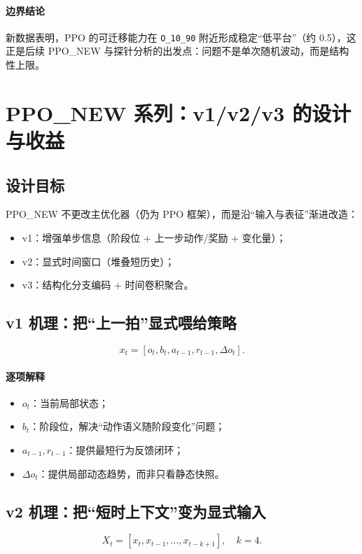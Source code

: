 ﻿\documentclass[11pt,a4paper]{ctexart}
\begin{document}
\paragraph{边界结论}
新数据表明，PPO 的可迁移能力在 \texttt{O\_10\_90} 附近形成稳定“低平台”（约 0.5），这正是后续 PPO\_NEW 与探针分析的出发点：问题不是单次随机波动，而是结构性上限。

\section{PPO\_NEW 系列：v1/v2/v3 的设计与收益}
\subsection{设计目标}
PPO\_NEW 不更改主优化器（仍为 PPO 框架），而是沿“输入与表征”渐进改造：
\begin{itemize}
  \item v1：增强单步信息（阶段位 + 上一步动作/奖励 + 变化量）；
  \item v2：显式时间窗口（堆叠短历史）；
  \item v3：结构化分支编码 + 时间卷积聚合。
\end{itemize}

\subsection{v1 机理：把“上一拍”显式喂给策略}
\begin{equation}
x_t=[o_t,b_t,a_{t-1},r_{t-1},\Delta o_t].
\end{equation}

\paragraph{逐项解释}
\begin{itemize}
  \item $o_t$：当前局部状态；
  \item $b_t$：阶段位，解决“动作语义随阶段变化”问题；
  \item $a_{t-1},r_{t-1}$：提供最短行为反馈闭环；
  \item $\Delta o_t$：提供局部动态趋势，而非只看静态快照。
\end{itemize}

\subsection{v2 机理：把“短时上下文”变为显式输入}
\begin{equation}
X_t=[x_t,x_{t-1},\ldots,x_{t-k+1}],\quad k=4.
\end{equation}
\end{document}
